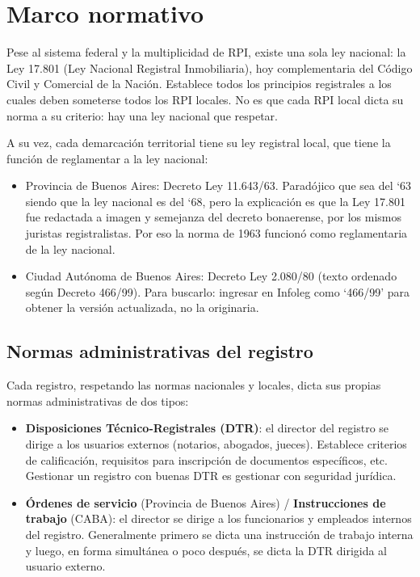 \documentclass[12pt,oneside]{book}
\begin{document}

\chapter{Marco normativo}
\label{chap:marco-normativo}

Pese al sistema federal y la multiplicidad de RPI, existe una sola ley nacional: la Ley 17.801 (Ley Nacional Registral Inmobiliaria), hoy complementaria del Código Civil y Comercial de la Nación. Establece todos los principios registrales a los cuales deben someterse todos los RPI locales. No es que cada RPI local dicta su norma a su criterio: hay una ley nacional que respetar.

A su vez, cada demarcación territorial tiene su ley registral local, que tiene la función de reglamentar a la ley nacional:

\begin{itemize}
    \item Provincia de Buenos Aires: Decreto Ley 11.643/63. Paradójico que sea del `63 siendo que la ley nacional es del `68, pero la explicación es que la Ley 17.801 fue redactada a imagen y semejanza del decreto bonaerense, por los mismos juristas registralistas. Por eso la norma de 1963 funcionó como reglamentaria de la ley nacional.
    \item Ciudad Autónoma de Buenos Aires: Decreto Ley 2.080/80 (texto ordenado según Decreto 466/99). Para buscarlo: ingresar en Infoleg como `466/99' para obtener la versión actualizada, no la originaria.
\end{itemize}

\section{Normas administrativas del registro}
\label{sec:normas-administrativas}

Cada registro, respetando las normas nacionales y locales, dicta sus propias normas administrativas de dos tipos:

\begin{itemize}
    \item \textbf{Disposiciones Técnico-Registrales (DTR)}: el director del registro se dirige a los usuarios externos (notarios, abogados, jueces). Establece criterios de calificación, requisitos para inscripción de documentos específicos, etc. Gestionar un registro con buenas DTR es gestionar con seguridad jurídica.
    \item \textbf{Órdenes de servicio} (Provincia de Buenos Aires) / \textbf{Instrucciones de trabajo} (CABA): el director se dirige a los funcionarios y empleados internos del registro. Generalmente primero se dicta una instrucción de trabajo interna y luego, en forma simultánea o poco después, se dicta la DTR dirigida al usuario externo.
\end{itemize}
\end{document}
